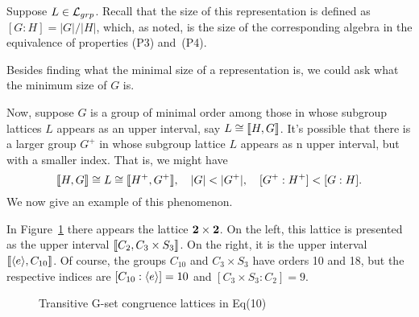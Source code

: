 Suppose $L\in \mathcal{L}_{grp}$. Recall that the size of this representation
is defined as $[G : H]=|G|/|H|$, which, as noted, is the size of the 
corresponding algebra in the equivalence of properties (P3) and~(P4). 

Besides finding what the minimal size of a representation is, we could ask
what the minimum size of $G$ is.



Now, suppose $G$ is a group of minimal order among those in whose
subgroup lattices $L$ appears as an upper interval, say $L \cong \llbracket H, G\rrbracket$.
It's possible that there is a larger group $G^+$ in whose subgroup lattice $L$
appears as n upper interval, but with a smaller index. That is, we might have
\[\llbracket H, G \rrbracket \cong L \cong \llbracket H^+, G^+\rrbracket, \quad |G| < |G^+|,
\quad [G^+:H^+] < [G:H].\]
We now give an example of this phenomenon. 

In Figure~\ref{fig:10} there appears the lattice $\mathbf{2}\times \mathbf{2}$.
On the left, this lattice is presented as the upper interval
$\llbracket C_2, C_3 \times S_3\rrbracket$. On the right, it is the upper interval 
$\llbracket \langle e\rangle, C_{10}\rrbracket$. Of course, the groups $C_{10}$ and
$C_3 \times S_3$ have orders 10 and 18, but the respective indices are
$[C_{10}:\langle e\rangle] = 10$ and $[C_3 \times S_3:C_2]=9$. 
\begin{figure}
\caption{Transitive G-set congruence lattices in Eq(10)}
\label{fig:10}
\begin{center}
\end{center}
\end{figure}

